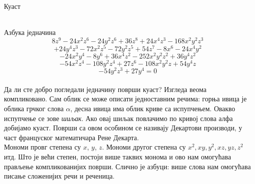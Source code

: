 \documentclass[en]{./../../common/SurferDesc}%
\begin{document}
\footnotesize





\begin{surferPage}
  \begin{surferTitle}Куаст\end{surferTitle} \\
Азбука једначина
  \smallskip
\[8z^9-24x^2z^6-24y^2z^6+36z^8+24x^4z^3-168x^2y^2z^3\]
\[+24y^4z^3-72x^2z^5-72y^2z^5+54z^7-8x^6-24x^4y^2\]
\[-24x^2y^4-8y^6 + 36x^4z^2-252x^2y^2z^2+36y^4z^2\]
\[- 54x^2z^4-108y^2z^4 + 27z^6-108x^2y^2z + 54y^4z\]
\[-54y^2z^3 + 27y^4 = 0\]\\
\vspace{0.3cm}
Да ли сте добро погледали једначину површи куаст? Изгледа веома компликовано. Сам облик се може описати једноставним речима: горња ивица је облика грчког слова $\alpha$, десна ивица има облик криве са испупчењем. Овакво испупчење се зове {\it шиљак}. Ако овај шиљак  повлачимо по кривој слова алфа добијамо куаст. Површи са овом особином се називају Декартови производи, у част француског математичара Рене Декарта.\\
\vspace{0.3cm}
Мономи провг степена су $x$, $y$, $z$. Мономи другог степена су $x^2, xy, y^2, xz, yz, z^2$ итд. Што је већи степен, постоји више таквих монома и ово нам омогућава прављење компликованијих површи. Слично је азбуци: више слова нам омогућава писање сложенијих речи и реченица. 




  \begin{surferText}
     \end{surferText}
\end{surferPage}
\end{document}
